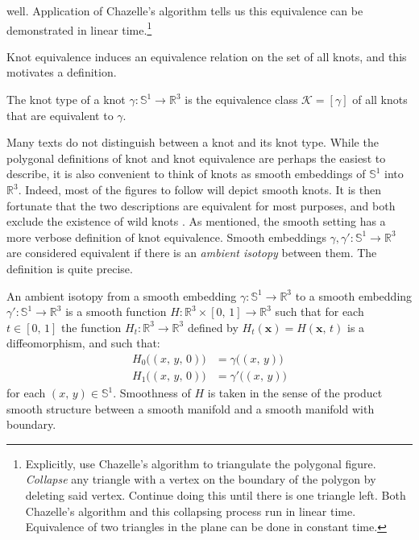     well. Application of Chazelle's algorithm
    \cite{ChazelleTriangulationAlgorithm} tells us this equivalence
    can be demonstrated in linear time.\footnote{%
        Explicitly, use Chazelle's algorithm to triangulate the polygonal
        figure. \textit{Collapse} any triangle with a vertex on the boundary
        of the polygon by deleting said vertex. Continue doing this until there
        is one triangle left. Both Chazelle's algorithm and this collapsing
        process run in linear time. Equivalence of two triangles in the
        plane can be done in constant time.
    }
    \par\hfill\par
    Knot equivalence induces an equivalence relation on the set of all knots,
    and this motivates a definition.
    \begin{definition}
        The knot type of a knot $\gamma:\mathbb{S}^{1}\rightarrow\mathbb{R}^{3}$
        is the equivalence class $\mathcal{K}=[\gamma]$ of all knots that are
        equivalent to $\gamma$.
    \end{definition}
    Many texts do not distinguish between a knot and its knot type.
    While the polygonal definitions of knot and knot equivalence are perhaps
    the easiest to describe, it is also convenient to think of knots as smooth
    embeddings of $\mathbb{S}^{1}$ into $\mathbb{R}^{3}$. Indeed, most of the
    figures to follow will depict smooth knots. It is then fortunate that the
    two descriptions are equivalent for most purposes, and both exclude the
    existence of wild knots \cite[p.~147]{CrowellFoxKnotTheory}. As mentioned,
    the smooth setting has a more verbose definition of knot equivalence.
    Smooth embeddings $\gamma,\gamma':\mathbb{S}^{1}\rightarrow\mathbb{R}^{3}$
    are considered equivalent if there is an \textit{ambient isotopy}
    between them. The definition is quite precise.
    \newpage
    \begin{definition}
        An ambient isotopy from a smooth embedding
        $\gamma:\mathbb{S}^{1}\rightarrow\mathbb{R}^{3}$ to a smooth
        embedding $\gamma':\mathbb{S}^{1}\rightarrow\mathbb{R}^{3}$ is a
        smooth function
        $H:\mathbb{R}^{3}\times[0,\,1]\rightarrow\mathbb{R}^{3}$
        such that for each $t\in[0,\,1]$ the function
        $H_{t}:\mathbb{R}^{3}\rightarrow\mathbb{R}^{3}$ defined by
        $H_{t}(\mathbf{x})=H(\mathbf{x},\,t)$ is a diffeomorphism,
        and such that:
        \begin{subequations}
            \begin{align}
                H_{0}\big((x,\,y,\,0)\big)&=\gamma\big((x,\,y)\big)\\
                H_{1}\big((x,\,y,\,0)\big)&=\gamma'\big((x,\,y)\big)
            \end{align}
        \end{subequations}
        for each $(x,\,y)\in\mathbb{S}^{1}$. Smoothness of $H$ is taken in
        the sense of the product smooth structure between a smooth manifold and
        a smooth manifold with boundary.
    \end{definition}
